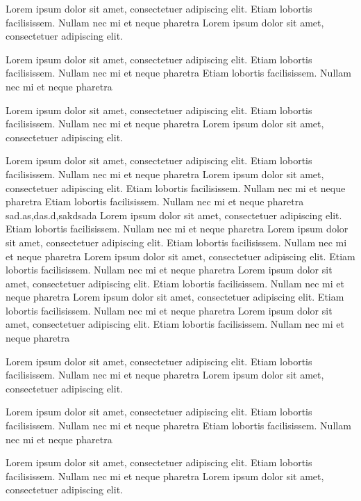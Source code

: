\documentclass[12pt,oneside,justify]{book}
\begin{document}
Lorem ipsum dolor sit amet, consectetuer adipiscing elit.  
Etiam lobortis facilisissem.  Nullam nec mi et neque pharetra Lorem ipsum dolor sit amet, consectetuer adipiscing elit.  
 
Lorem ipsum dolor sit amet, consectetuer adipiscing elit.  
Etiam lobortis facilisissem.  Nullam nec mi et neque pharetra Etiam lobortis facilisissem.  Nullam nec mi et neque pharetra  
 
Lorem ipsum dolor sit amet, consectetuer adipiscing elit.  
Etiam lobortis facilisissem.  Nullam nec mi et neque pharetra Lorem ipsum dolor sit amet, consectetuer adipiscing elit.  
 
Lorem ipsum dolor sit amet, consectetuer adipiscing elit.  
Etiam lobortis facilisissem.  Nullam nec mi et neque pharetra  
Lorem ipsum dolor sit amet, consectetuer adipiscing elit.  
Etiam lobortis facilisissem.  Nullam nec mi et neque pharetra Etiam lobortis facilisissem.  Nullam nec mi et neque pharetra 
 sad.as,das.d,sakdsada
Lorem ipsum dolor sit amet, consectetuer adipiscing elit.  
Etiam lobortis facilisissem.  Nullam nec mi et neque pharetra  
Lorem ipsum dolor sit amet, consectetuer adipiscing elit.  
Etiam lobortis facilisissem.  Nullam nec mi et neque pharetra  
Lorem ipsum dolor sit amet, consectetuer adipiscing elit.  
Etiam lobortis facilisissem.  Nullam nec mi et neque pharetra  
Lorem ipsum dolor sit amet, consectetuer adipiscing elit.  
Etiam lobortis facilisissem.  Nullam nec mi et neque pharetra  
Lorem ipsum dolor sit amet, consectetuer adipiscing elit.  
Etiam lobortis facilisissem.  Nullam nec mi et neque pharetra   
Lorem ipsum dolor sit amet, consectetuer adipiscing elit.  
Etiam lobortis facilisissem.  Nullam nec mi et neque pharetra  
 
Lorem ipsum dolor sit amet, consectetuer adipiscing elit.  
Etiam lobortis facilisissem.  Nullam nec mi et neque pharetra Lorem ipsum dolor sit amet, consectetuer adipiscing elit.  
 
Lorem ipsum dolor sit amet, consectetuer adipiscing elit.  
Etiam lobortis facilisissem.  Nullam nec mi et neque pharetra Etiam lobortis facilisissem.  Nullam nec mi et neque pharetra  
 
Lorem ipsum dolor sit amet, consectetuer adipiscing elit.  
Etiam lobortis facilisissem.  Nullam nec mi et neque pharetra Lorem ipsum dolor sit amet, consectetuer adipiscing elit.  
 
\end{document}
